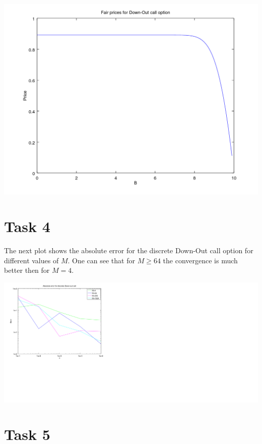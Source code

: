 \documentclass[10pt,a4paper]{article}
\begin{document}
\begin{center}
	\includegraphics[scale=0.4]{fair_prices_down_out_call.png}
\end{center}

\section*{Task 4}

The next plot shows the absolute error for the discrete Down-Out call option for different values of $M$. One can see that for $M\geq64$ the convergence is much better then for $M=4$.  

\begin{center}
	\includegraphics[scale=0.5]{convergence_plot_discrete_down_out_call.png}
\end{center}

\section*{Task 5}
\end{document}
